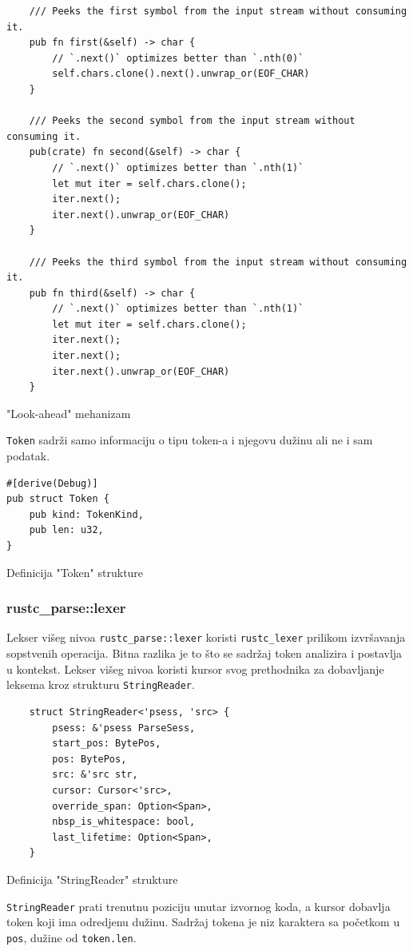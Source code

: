 \documentclass[11pt]{article}
\begin{document}
\begin{listing}[H]
\begin{verbatim}
    /// Peeks the first symbol from the input stream without consuming it.
    pub fn first(&self) -> char {
        // `.next()` optimizes better than `.nth(0)`
        self.chars.clone().next().unwrap_or(EOF_CHAR)
    }

    /// Peeks the second symbol from the input stream without consuming it.
    pub(crate) fn second(&self) -> char {
        // `.next()` optimizes better than `.nth(1)`
        let mut iter = self.chars.clone();
        iter.next();
        iter.next().unwrap_or(EOF_CHAR)
    }

    /// Peeks the third symbol from the input stream without consuming it.
    pub fn third(&self) -> char {
        // `.next()` optimizes better than `.nth(1)`
        let mut iter = self.chars.clone();
        iter.next();
        iter.next();
        iter.next().unwrap_or(EOF_CHAR)
    }
\end{verbatim}
\caption{"Look-ahead" mehanizam}
\end{listing}
\verb|Token| sadrži samo informaciju o tipu token-a i njegovu dužinu ali ne i 
sam podatak.

\begin{listing}[H]
\begin{verbatim}
#[derive(Debug)]
pub struct Token {
    pub kind: TokenKind,
    pub len: u32,
}   
\end{verbatim}
\caption{Definicija "Token" strukture}
\end{listing}

\newpage
\subsubsection{rustc\_parse::lexer}

Lekser višeg nivoa \verb|rustc_parse::lexer| koristi \verb|rustc_lexer| prilikom izvršavanja sopstvenih
operacija. Bitna razlika je to što se sadržaj token analizira i postavlja u kontekst.
Lekser višeg nivoa koristi kursor svog prethodnika za dobavljanje leksema kroz strukturu \verb|StringReader|. 

\begin{listing}[H]
\begin{verbatim}
    struct StringReader<'psess, 'src> {
        psess: &'psess ParseSess,
        start_pos: BytePos,
        pos: BytePos,
        src: &'src str,
        cursor: Cursor<'src>,
        override_span: Option<Span>,
        nbsp_is_whitespace: bool,
        last_lifetime: Option<Span>,
    }
\end{verbatim}
\caption{Definicija "StringReader" strukture}
\end{listing}
\verb|StringReader| prati trenutnu poziciju unutar izvornog koda, a kursor 
dobavlja token koji ima odredjenu dužinu. Sadržaj tokena je niz karaktera sa početkom u \verb|pos|,
dužine od \verb|token.len|. 
\end{document}
